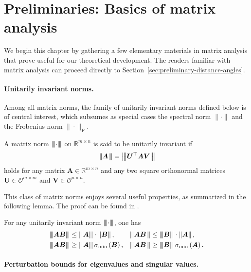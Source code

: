 \section{Preliminaries: Basics of matrix analysis} \label{subsec:Matrix-analysis}


We begin this chapter by gathering a few elementary materials in matrix analysis that prove useful for our theoretical development. The readers familiar with matrix analysis can proceed directly to Section~\ref{sec:preliminary-distance-angles}. 
 

 
\paragraph{Unitarily invariant norms.}



Among all matrix norms, the family of unitarily invariant norms defined below is of central interest, which subsumes  as special cases the spectral norm $\|\cdot\|$ and the Frobenius norm $\|\cdot\|_{\mathrm{F}}$.
%
\begin{definition}
A matrix norm ${\left\vert\kern-0.25ex\left\vert\kern-0.25ex\left\vert \cdot \right\vert\kern-0.25ex\right\vert\kern-0.25ex\right\vert}$ on $\mathbb{R}^{m\times n}$ is said to be unitarily invariant if
%
\[
	{\left\vert\kern-0.25ex\left\vert\kern-0.25ex\left\vert \bm{A} \right\vert\kern-0.25ex\right\vert\kern-0.25ex\right\vert}={\big\vert\kern-0.25ex\big\vert\kern-0.25ex\big\vert \bm{U}^{\top}\bm{A}\bm{V} \big\vert\kern-0.25ex\big\vert\kern-0.25ex\big\vert}
\]
%
holds for any matrix $\bm{A}\in\mathbb{R}^{m\times n}$ and any two square orthonormal
matrices $\bm{U}\in\mathcal{O}^{m\times m}$ and $\bm{V}\in\mathcal{O}^{n\times n}$.
\end{definition}
%
This class of matrix norms enjoys several useful properties, as summarized in the following lemma. The proof can be found in \citet[Theorem 3.9]{stewart1990matrix}.
%
\begin{lemma}
\label{prop:unitary_norm_relation}
For any unitarily invariant norm ${\left\vert\kern-0.25ex\left\vert\kern-0.25ex\left\vert \cdot \right\vert\kern-0.25ex\right\vert\kern-0.25ex\right\vert}$, one has 
%
\begin{align*}
\vertiii{\bm{A}\bm{B}} & \leq\vertiii{\bm{A}} \cdot  \left\Vert \bm{B}\right\Vert, &  & \vertiii{\bm{A}\bm{B}}\leq\vertiii{\bm{B}} \cdot \left\Vert \bm{A}\right\Vert,\\
\vertiii{\bm{A}\bm{B}} & \geq\vertiii{\bm{A}} \, \sigma_{\min}\left(\bm{B}\right), &  & \vertiii{\bm{A}\bm{B}}\geq\vertiii{\bm{B}} \, \sigma_{\min}\left(\bm{A}\right).
\end{align*}
%
\end{lemma}



	
\paragraph{Perturbation bounds for eigenvalues and singular values.}

